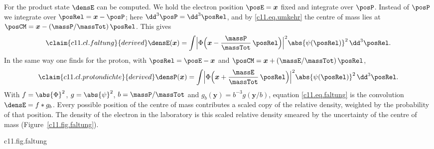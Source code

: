 For the product state $\densE$ can be computed. We hold the electron position
$\posE = \boldsymbol{x}$ fixed and integrate over $\posP$. Instead of $\posP$ we
integrate over $\posRel = \boldsymbol{x} - \posP$; here $\dd^3\posP = \dd^3\posRel$, and
by \eqref{c11.eq.umkehr} the centre of mass lies at
$\posCM = \boldsymbol{x} - (\massP/\massTot)\,\posRel$. This gives
\begin{equation}\label{c11.eq.faltung}\claim{c11.cl.faltung}{derived}
  \densE(\boldsymbol{x})
  = \int \Bigl\lvert \Phi\Bigl(\boldsymbol{x} - \frac{\massP}{\massTot}\,\posRel\Bigr)
    \Bigr\rvert^2 \abs{\psi(\posRel)}^2 \,\dd^3\posRel .
\end{equation}
In the same way one finds for the proton, with $\posRel = \posE - \boldsymbol{x}$ and
$\posCM = \boldsymbol{x} + (\massE/\massTot)\,\posRel$,
\begin{equation}\label{c11.eq.protondichte}\claim{c11.cl.protondichte}{derived}
  \densP(\boldsymbol{x})
  = \int \Bigl\lvert \Phi\Bigl(\boldsymbol{x} + \frac{\massE}{\massTot}\,\posRel\Bigr)
    \Bigr\rvert^2 \abs{\psi(\posRel)}^2 \,\dd^3\posRel .
\end{equation}
With $f = \abs{\Phi}^2$, $g = \abs{\psi}^2$, $b = \massP/\massTot$ and
$g_b(\boldsymbol{y}) = b^{-3}g(\boldsymbol{y}/b)$, equation \eqref{c11.eq.faltung} is
the convolution $\densE = f * g_b$. Every possible position of the centre of mass
contributes a scaled copy of the relative density, weighted by the probability of
that position. The density of the electron in the laboratory is this scaled relative
density smeared by the uncertainty of the centre of mass (Figure~\ref{c11.fig.faltung}).

\begin{tpcfigure}{c11.fig.faltung}
  \caption{The convolution \eqref{c11.eq.faltung} along a straight line through the
    centre of the centre-of-mass packet, for $\Znuc = 1$. Thin solid: the relative
    density $\abs{\psinlm{1}{0}{0}}^2$ of the state 1s of Section~\ref{c11.s5}.
    Dashed: the density $\abs{\Phi}^2$ of a centre-of-mass packet in the shape of a bell
    curve; its width, $\num[c11.cl.wolke]{0.7}{}$ units of length, is chosen for the
    picture. Heavy: the density $\densE$ of the electron in the laboratory. It is wider
    and flatter than both. At the marked point, one unit of length from the centre,
    $\densE\,\aRed^3 = \num[c11.cl.wolke]{0.0379}{}$. The unit of length is the Bohr
    radius $\aRed$ with the reduced mass of Section~\ref{c11.s4}.}
\end{tpcfigure}

